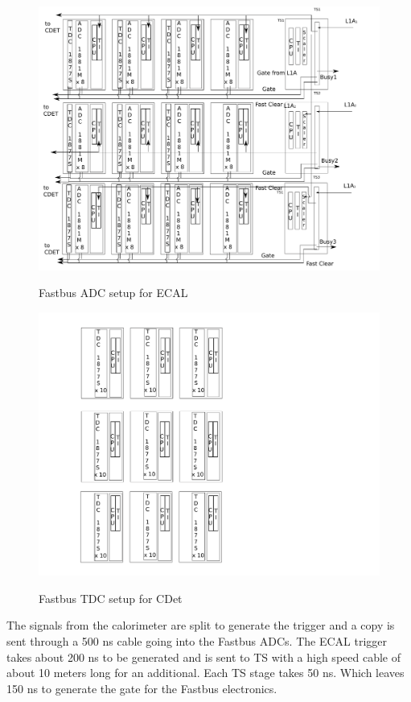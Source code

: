 \documentclass{article}
\begin{document}
\begin{figure}
\includegraphics[scale=0.55]{figs/FastbusEcalDetailed.pdf}\\
  \caption{Fastbus ADC setup for ECAL }\label{fig:FastbusEcal}

\end{figure}
\begin{figure}
\includegraphics[scale=0.55]{figs/FastbusCDetDetailed.pdf}\\
  \caption{Fastbus TDC setup for CDet}\label{fig:FastbusCdet}

\end{figure}

The signals from the calorimeter are split to generate the trigger and a copy is sent through a 500 ns cable going into the Fastbus ADCs.
The ECAL trigger takes about 200 ns to be generated and is sent to TS with a high speed cable of about 10 meters long for an additional. Each TS stage takes 50 ns. Which leaves 150 ns to generate the gate for the Fastbus electronics.
\end{document}
